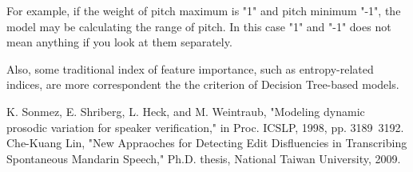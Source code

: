 \documentclass[12pt]{article}
\begin{document}
For example, if the weight of pitch maximum is "1" and pitch minimum "-1", the model may be calculating the range of pitch. In this case "1" and "-1" does not mean anything if you look at them separately.

Also, some traditional index of feature importance, such as entropy-related indices, are more correspondent the the criterion of Decision Tree-based models.


\begin{thebibliography}{99}
 K. Sonmez, E. Shriberg, L. Heck, and M. Weintraub, "Modeling dynamic prosodic variation for speaker verification," in Proc. ICSLP, 1998, pp. 3189~3192.
 Che-Kuang Lin, "New Appraoches for Detecting Edit Disfluencies in Transcribing Spontaneous Mandarin Speech," Ph.D. thesis, National Taiwan University, 2009.
\end{thebibliography}
\end{document}
